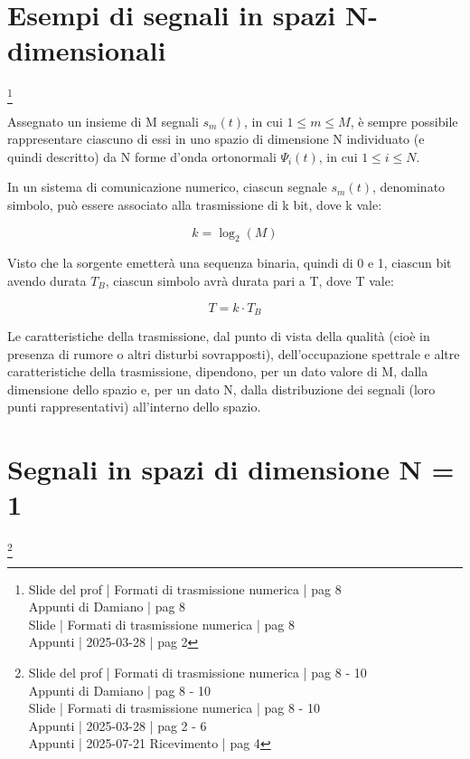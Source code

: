 \newpage 

\section{Esempi di segnali in spazi N-dimensionali}
\footnote{Slide del prof | Formati di trasmissione numerica | pag 8 \\  
Appunti di Damiano | pag 8 \\
Slide | Formati di trasmissione numerica | pag  8\\
Appunti | 2025-03-28 | pag 2
}

Assegnato un insieme di M segnali $s_m (t)$, in cui $1 \le m \le M$, 
è sempre possibile rappresentare ciascuno di essi in uno spazio di dimensione N individuato (e quindi descritto) da N forme d'onda ortonormali $\Psi_i (t)$, 
in cui $1 \le i \le N$. \newline 

In un sistema di comunicazione numerico, ciascun segnale $s_m (t)$, denominato simbolo, 
può essere associato alla trasmissione di k bit, dove k vale: 

{
    \Large 
    \begin{equation}
        k = \log_{2} (M)
    \end{equation}
}

Visto che la sorgente emetterà una sequenza binaria, quindi di 0 e 1, 
ciascun bit avendo durata $T_B$, ciascun simbolo avrà durata pari a T, dove T vale: 

{
    \Large 
    \begin{equation}
        T = k \cdot T_B
    \end{equation}
}

Le caratteristiche della trasmissione, dal punto di vista della qualità (cioè in presenza di rumore o altri disturbi sovrapposti), 
dell'occupazione spettrale e altre caratteristiche della trasmissione, 
dipendono, per un dato valore di M, dalla dimensione dello spazio e, 
per un dato N, dalla distribuzione dei segnali (loro punti rappresentativi) all'interno dello spazio. \newline 

\newpage

\section{Segnali in spazi di dimensione N = 1}
\footnote{Slide del prof | Formati di trasmissione numerica | pag 8 - 10\\  
Appunti di Damiano | pag 8 - 10\\
Slide | Formati di trasmissione numerica | pag  8 - 10\\
Appunti | 2025-03-28 | pag 2 - 6 \\
Appunti | 2025-07-21 Ricevimento | pag 4
}

